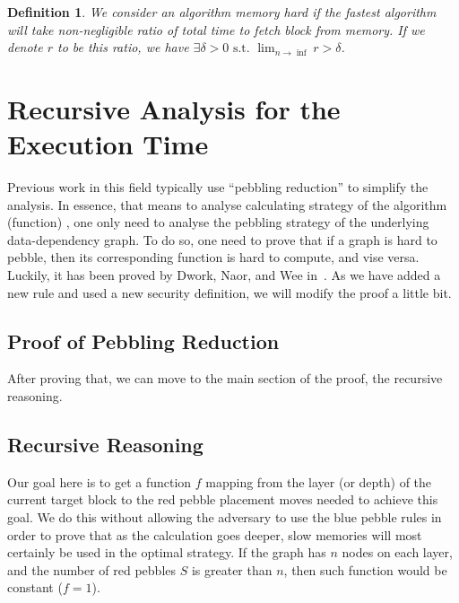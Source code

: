 \documentclass[a4paper]{article}
\newtheorem{definition}{Definition}
\begin{document}
\begin{definition}\label{def::secDef}
  We consider an algorithm memory hard if the fastest algorithm will take non-negligible ratio
  of total time to fetch block from memory. If we denote $r$ to be this ratio, we have
  $\exists\delta>0 \text{ s.t. }\lim_{n\rightarrow \inf} r > \delta$.
\end{definition}

\section{Recursive Analysis for the Execution Time}\label{sec::analysis}

Previous work in this field typically use ``pebbling reduction'' to simplify the analysis. In essence, that means to
analyse calculating strategy of the algorithm (function) %
, one only need to analyse the pebbling strategy of the underlying data-dependency graph.
To do so, one need to prove that if a graph is hard to pebble, then its corresponding function is hard to compute, and
vise versa. Luckily, it has been proved by Dwork, Naor, and Wee in~\cite{dwork2005pebbling}.
As we have added a new rule and used a new security definition, we will modify the proof a little bit.

\subsection{Proof of Pebbling Reduction}

After proving that, we can move to the main section of the proof, the recursive reasoning.
\subsection{Recursive Reasoning}
Our goal here is to get a function $f$ mapping from the layer (or depth) of the current target block to the red pebble placement
moves needed to achieve this goal. We do this without allowing the adversary to use the blue pebble rules in order to prove that
as the calculation goes deeper, slow memories will most certainly be used in the optimal strategy. %
If the graph has $n$ nodes on each layer, and the number of red pebbles $S$ is greater than $n$,
then such function would be constant ($f = 1$).
\end{document}
